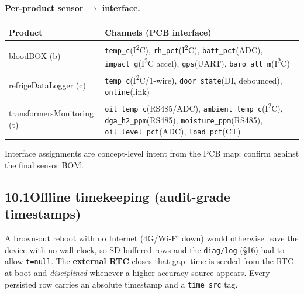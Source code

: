 \paragraph{Per-product sensor $\to$ interface.}
\begin{center}
\renewcommand{\arraystretch}{1.2}\small
\begin{tabularx}{\textwidth}{@{}l X@{}}
\toprule
\textbf{Product} & \textbf{Channels (PCB interface)} \\
\midrule
bloodBOX (b) & \texttt{temp\_c}(I\textsuperscript{2}C), \texttt{rh\_pct}(I\textsuperscript{2}C), \texttt{batt\_pct}(ADC),
  \texttt{impact\_g}(I\textsuperscript{2}C accel), \texttt{gps}(UART), \texttt{baro\_alt\_m}(I\textsuperscript{2}C) \\
refrigeDataLogger (c) & \texttt{temp\_c}(I\textsuperscript{2}C/1-wire), \texttt{door\_state}(DI, debounced),
  \texttt{online}(link) \\
transformersMonitoring (t) & \texttt{oil\_temp\_c}(RS485/ADC), \texttt{ambient\_temp\_c}(I\textsuperscript{2}C),
  \texttt{dga\_h2\_ppm}(RS485), \texttt{moisture\_ppm}(RS485), \texttt{oil\_level\_pct}(ADC),
  \texttt{load\_pct}(CT) \\
\bottomrule
\end{tabularx}
\end{center}
{\footnotesize Interface assignments are concept-level intent from the PCB map; confirm against
the final sensor BOM.}

\subsection*{10.1\quad Offline timekeeping (audit-grade timestamps)}
A brown-out reboot with no Internet (4G/Wi-Fi down) would otherwise leave the device with no
wall-clock, so SD-buffered rows and the \texttt{diag/log} (\S16) had to allow \texttt{t=null}.
The \textbf{external RTC} closes that gap: time is seeded from the RTC at boot and \emph{disciplined}
whenever a higher-accuracy source appears. Every persisted row carries an absolute timestamp and a
\texttt{time\_src} tag.

